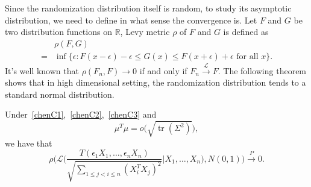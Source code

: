 \documentclass[smallcondensed,final,natbib]{svjour3}          %
\DeclareMathOperator{\mytr}{tr}
\begin{document}
Since the randomization distribution itself is random, to study its asymptotic distribution, we need to define in what sense the convergence is. Let $F$ and $G$ be two distribution functions on $\mathbb{R}$, Levy metric $\rho$ of $F$ and $G$ is defined as
    \begin{equation*}
    \begin{aligned}
        &\rho(F,G)\\
        =&\inf\{\epsilon:F(x-\epsilon)-\epsilon\leq G(x)\leq F(x+\epsilon)+\epsilon  \textrm{ for all } x\}.
    \end{aligned}
    \end{equation*}
It's well known that $\rho(F_n,F)\to 0$ if and only if  $F_n\xrightarrow{\mathcal{L}}F$.
The following theorem shows that in high dimensional setting, the randomization distribution tends to a standard normal distribution.


\begin{theorem}\label{shaziCLT}
    Under~\eqref{chenC1},~\eqref{chenC2},~\eqref{chenC3} and 
    \begin{equation}\label{mu2}
        \mu^T\mu=o\big(\sqrt{\mytr ({\Sigma}^2)}\big),
    \end{equation}
    we have that
    \begin{equation*}
            \rho\bigg(\mathcal{L}\bigg(\frac{T(\epsilon_1 X_1,\ldots,\epsilon_n X_n)}{\sqrt{\sum_{1\leq j<i\leq n}{(X_i^T X_j)}^2}}\bigg|X_1,\ldots,X_n\bigg),N(0,1)\bigg)
            \xrightarrow{P} 0.
    \end{equation*}
\end{theorem}
\end{document}
